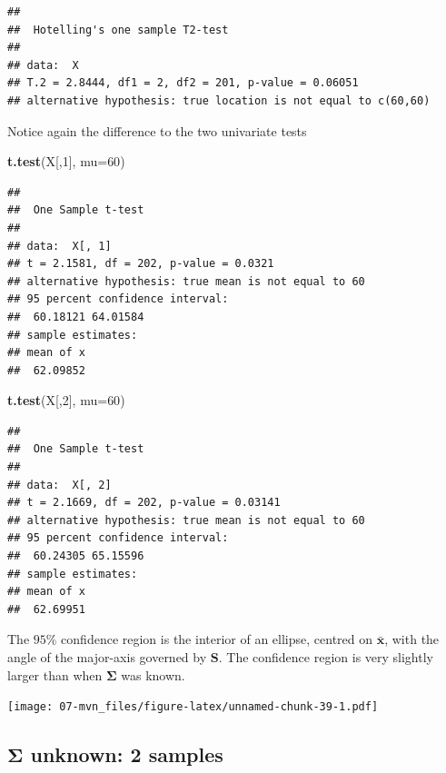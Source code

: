 \documentclass[]{book}
\newenvironment{Shaded}{\begin{snugshade}}{\end{snugshade}}
\newcommand{\DataTypeTok}[1]{\textcolor[rgb]{0.13,0.29,0.53}{#1}}
\newcommand{\DecValTok}[1]{\textcolor[rgb]{0.00,0.00,0.81}{#1}}
\newcommand{\KeywordTok}[1]{\textcolor[rgb]{0.13,0.29,0.53}{\textbf{#1}}}
\newcommand{\NormalTok}[1]{#1}
\theoremstyle{definition}
\theoremstyle{definition}
\theoremstyle{definition}
\theoremstyle{remark}
\begin{document}
\begin{verbatim}
## 
##  Hotelling's one sample T2-test
## 
## data:  X
## T.2 = 2.8444, df1 = 2, df2 = 201, p-value = 0.06051
## alternative hypothesis: true location is not equal to c(60,60)
\end{verbatim}

Notice again the difference to the two univariate tests

\begin{Shaded}
\begin{Highlighting}[]
\KeywordTok{t.test}\NormalTok{(X[,}\DecValTok{1}\NormalTok{], }\DataTypeTok{mu=}\DecValTok{60}\NormalTok{)}
\end{Highlighting}
\end{Shaded}

\begin{verbatim}
## 
##  One Sample t-test
## 
## data:  X[, 1]
## t = 2.1581, df = 202, p-value = 0.0321
## alternative hypothesis: true mean is not equal to 60
## 95 percent confidence interval:
##  60.18121 64.01584
## sample estimates:
## mean of x 
##  62.09852
\end{verbatim}

\begin{Shaded}
\begin{Highlighting}[]
\KeywordTok{t.test}\NormalTok{(X[,}\DecValTok{2}\NormalTok{], }\DataTypeTok{mu=}\DecValTok{60}\NormalTok{)}
\end{Highlighting}
\end{Shaded}

\begin{verbatim}
## 
##  One Sample t-test
## 
## data:  X[, 2]
## t = 2.1669, df = 202, p-value = 0.03141
## alternative hypothesis: true mean is not equal to 60
## 95 percent confidence interval:
##  60.24305 65.15596
## sample estimates:
## mean of x 
##  62.69951
\end{verbatim}

The \(95\)\% confidence region is the interior of an ellipse, centred on \(\bar{\boldsymbol x}\), with the angle of the major-axis governed by \(\boldsymbol S\). The confidence region is very slightly larger than when \(\boldsymbol \Sigma\) was known.

\texttt{[image: 07-mvn\_files/figure-latex/unnamed-chunk-39-1.pdf]}

\hypertarget{boldsymbol-sigma-unknown-2-samples}{%
\subsection{\texorpdfstring{\(\boldsymbol \Sigma\) unknown: 2 samples}{\textbackslash{}boldsymbol \textbackslash{}Sigma unknown: 2 samples}}\label{boldsymbol-sigma-unknown-2-samples}}
\end{document}
